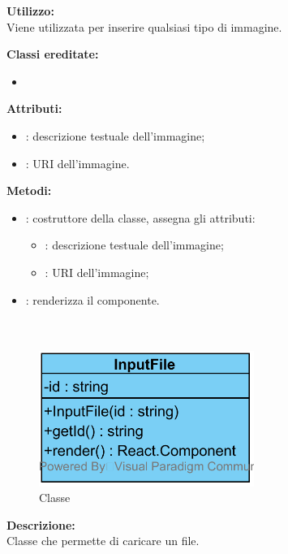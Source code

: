 \textbf{Utilizzo:}\\
Viene utilizzata per inserire qualsiasi tipo di immagine.

\textbf{Classi ereditate:}
\begin{itemize}
	\item {}
\end{itemize}


\textbf{Attributi:}
\begin{itemize}
	\item {}: descrizione testuale dell'immagine;
	\item {}: URI dell'immagine.
\end{itemize}

\textbf{Metodi:}
\begin{itemize}
	\item {}: costruttore della classe, assegna gli attributi:
	\begin{itemize}
		\item {}: descrizione testuale dell'immagine;
		\item {}: URI dell'immagine;
	\end{itemize}
	\item {}: renderizza il componente.
\end{itemize}

\paragraph[::InputFile]{\class}\mbox{}\\ \label{\class}
\begin{figure}[H]
	\centering
	\includegraphics[width=7cm]{./diagrammi/framework/view/gui/inputfile.png}
	\caption{Classe \class}
\end{figure}
\textbf{Descrizione:}\\
Classe che permette di caricare un file.

